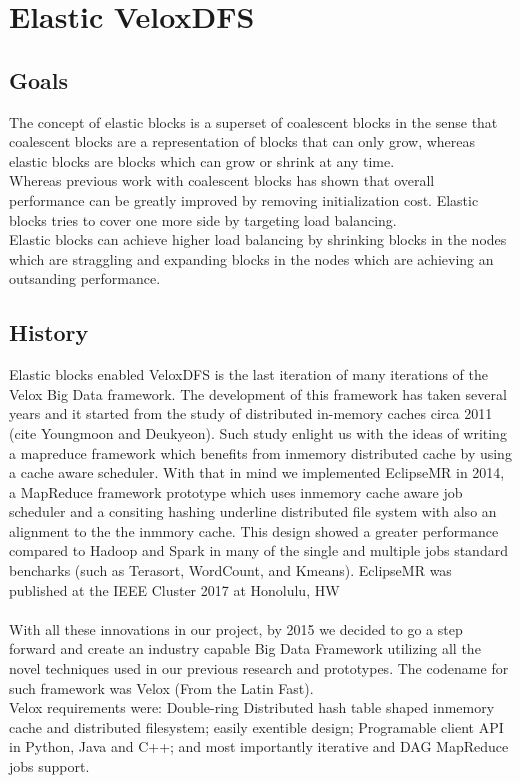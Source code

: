 \section{Elastic VeloxDFS}
\subsection{Goals}
The concept of elastic blocks is a superset of coalescent blocks in the sense that coalescent blocks are a representation of blocks that can only grow, whereas elastic blocks are blocks which can grow or shrink at any time. \\
Whereas previous work with coalescent blocks has shown that overall performance can be greatly improved by removing initialization cost. Elastic blocks tries to cover one more side by targeting load balancing. \\
Elastic blocks can achieve higher load balancing by shrinking blocks in the nodes which are straggling and expanding blocks in the nodes which are achieving an outsanding performance.


\subsection{History}
Elastic blocks enabled VeloxDFS is the last iteration of many iterations of the Velox Big Data framework. The development of this framework has taken several years and it started from the study of distributed in-memory caches circa 2011 (cite Youngmoon and Deukyeon). Such study enlight us with the ideas of writing a mapreduce framework which benefits from inmemory distributed cache by using a cache aware scheduler. With that in mind we implemented EclipseMR in 2014, a MapReduce framework prototype which uses inmemory cache aware job scheduler and a consiting hashing underline distributed file system with also an alignment to the the inmmory cache. This design showed a greater performance compared to Hadoop and Spark in many of the single and multiple jobs standard bencharks (such as Terasort, WordCount, and Kmeans). EclipseMR was published at the IEEE Cluster 2017 at Honolulu, HW\\\\

With all these innovations in our project, by 2015 we decided to go a step forward and create an industry capable Big Data Framework utilizing all the novel techniques used in our previous research and prototypes. The codename for such framework was Velox (From the Latin Fast). \\
Velox requirements were: Double-ring Distributed hash table shaped inmemory cache and distributed filesystem; easily exentible design; Programable client API in Python, Java and C++; and most importantly iterative and DAG MapReduce jobs support. \\

